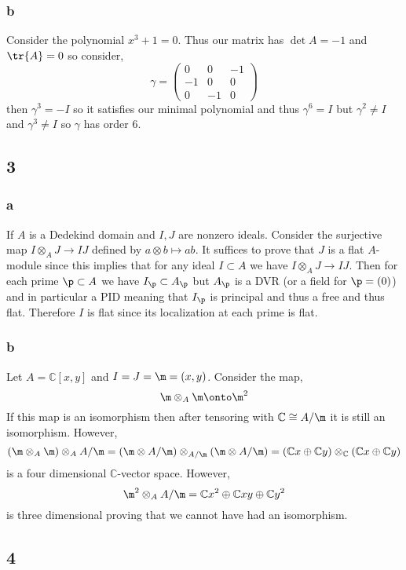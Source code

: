 \documentclass[12pt]{article}
\renewcommand{\C}{\mathbb{C}}
\begin{document}
\subsubsection{b}

Consider the polynomial $x^3 + 1 = 0$. Thus our matrix has $\det{A} = -1$ and $\tr{A} = 0$ so consider,
\[ \gamma = 
\begin{pmatrix}
0 & 0 & -1
\\
-1 & 0 & 0
\\
0 & - 1 & 0
\end{pmatrix} \]
then $\gamma^3 = -I$ so it satisfies our minimal polynomial and thus $\gamma^6 = I$ but $\gamma^2 \neq I$ and $\gamma^3 \neq I$ so $\gamma$ has order $6$.

\subsection{3}

\subsubsection{a}

If $A$ is a Dedekind domain and $I,J$ are nonzero ideals. Consider the surjective map $I \otimes_A J \to IJ$ defined by $a \otimes b \mapsto ab$. It suffices to prove that $J$ is a flat $A$-module since this implies that for any ideal $I \subset A$ we have $I \otimes_A J \to IJ$. Then for each prime $\p \subset A$ we have $I_\p \subset A_\p$ but $A_\p$ is a DVR (or a field for $\p = (0)$) and in particular a PID meaning that $I_\p$ is principal and thus a free and thus flat. Therefore $I$ is flat since its localization at each prime is flat.

\subsubsection{b}

Let $A = \C[x,y]$ and $I = J = \m = (x, y)$. Consider the map,
\[ \m \otimes_A \m \onto \m^2 \]
If this map is an isomorphism then after tensoring with $\C \cong A / \m$ it is still an isomorphism. However,
\[ (\m \otimes_A \m) \otimes_A A/\m = (\m \otimes A / \m) \otimes_{A / \m} (\m \otimes A / \m) = (\C x \oplus \C y) \otimes_\C (\C x \oplus \C y) \]
is a four dimensional $\C$-vector space. However,
\[ \m^2 \otimes_A A / \m = \C x^2 \oplus \C xy \oplus \C y^2 \]
is three dimensional proving that we cannot have had an isomorphism.

\subsection{4}
\end{document}
